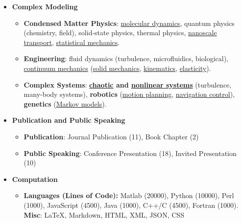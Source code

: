 \documentclass{article}
\begin{document}
\begin{itemize}[leftmargin=*]


  \item \textbf{Complex Modeling}
  \begin{itemize}
    \item \textbf{Condensed Matter Physics}: \href{https://en.wikipedia.org/wiki/Molecular_dynamics}{molecular dynamics}, quantum physics (chemistry, field), solid-state physics, thermal physics, \href{http://ntpl.me.cmu.edu/}{nanoscale transport}, \href{https://en.wikipedia.org/wiki/Statistical_mechanics}{statistical mechanics}.
    \item \textbf{Engineering}: fluid dynamics (turbulence,  microfluidics, biological), \href{https://en.wikipedia.org/wiki/Continuum_mechanics}{continuum mechanics} (\href{https://en.wikipedia.org/wiki/Solid_mechanics}{solid mechanics}, \href{https://en.wikipedia.org/wiki/Kinematics}{kinematics}, \href{https://en.wikipedia.org/wiki/Elasticity_(physics)}{elasticity}).
    \item \textbf{Complex Systems}: \textbf{\href{https://en.wikipedia.org/wiki/Chaos_theory}{chaotic} and \href{https://en.wikipedia.org/wiki/Nonlinear_system}{nonlinear systems}} (turbulence, many-body systems), \textbf{robotics} (\href{https://en.wikipedia.org/wiki/Motion_planning}{motion planning}, \href{https://en.wikipedia.org/wiki/Mobile_robot_navigation}{navigation control}), \textbf{genetics} (\href{https://en.wikipedia.org/wiki/Markov_chain}{Markov models}).

  \end{itemize}

  \item \textbf{Publication and Public Speaking} 
  \begin{itemize}
    \item \textbf{Publication}: Journal Publication (11), Book Chapter (2) 
    \item \textbf{Public Speaking}: Conference Presentation (18), Invited Presentation (10)
  \end{itemize}

  \item \textbf{Computation}
  \begin{itemize}

    \item \textbf{Languages (Lines of Code): } Matlab (20000), Python (10000), Perl (1000), JavaScript (4500), Java (1000), C++/C (4500), Fortran (1000). \textbf{Misc}: \LaTeX, Markdown, HTML, XML, JSON, CSS 


\end{itemize}
\end{itemize}
\end{document}
